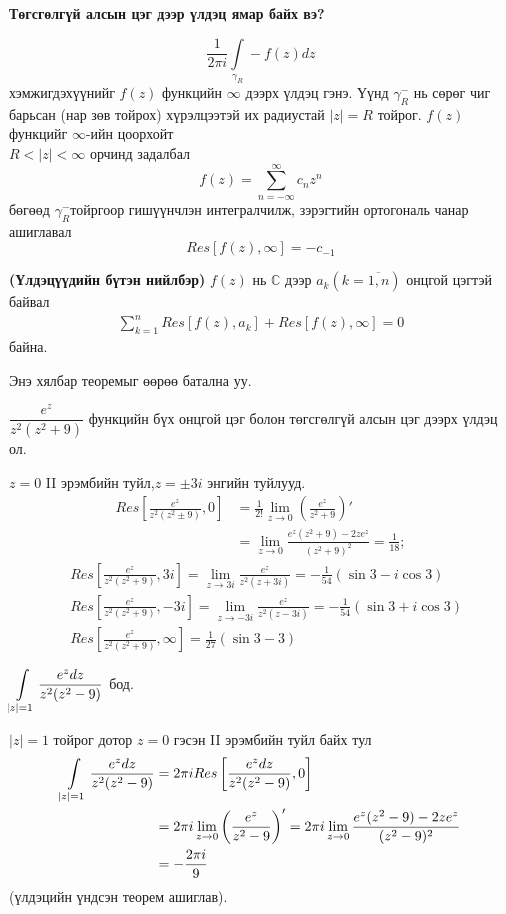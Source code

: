 \textbf{Төгсгөлгүй алсын цэг дээр үлдэц ямар байх вэ? } 
\begin{dfn}
$$\frac{1}{2\pi i}\int\limits_{\gamma_R}-f(z)dz$$
хэмжигдэхүүнийг $f(z)$ функцийн $\infty$ дээрх үлдэц гэнэ. Үүнд $\gamma^-_R$ нь сөрөг чиг барьсан (нар зөв тойрох) хүрэлцээтэй их радиустай $|z|=R$ тойрог. $f(z)$ функцийг $\infty$-ийн цоорхойт \\ $R<|z|<\infty$ орчинд задалбал
$$f(z)=\sum\limits_{n=-\infty}^\infty c_n z^n$$
бөгөөд $\gamma^-_R$тойргоор гишүүнчлэн интегралчилж, зэрэгтийн ортогональ чанар ашиглавал
$$Res [f(z),\infty]=-c_{-1}$$
\end{dfn}
\begin{thm}
\textbf{(Үлдэцүүдийн бүтэн нийлбэр)}  $f(z)$ нь $\mathbb{C}$ дээр $a_k(k=\overline{1,n})$ онцгой цэгтэй байвал
\begin{eqnarray}
\sum\limits_{k=1}^nRes [f(z),a_k]+Res [f(z),\infty]=0
\end{eqnarray} байна. 

Энэ хялбар теоремыг өөрөө батална уу.
\end{thm}
\begin{exm}
$\dfrac{e^z}{z^2(z^2+9)}$ функцийн бүх онцгой цэг болон төгсгөлгүй алсын цэг дээрх үлдэц ол.
\end{exm}
\begin{prf}
$z=0$ II эрэмбийн туйл,$z=\pm 3i$ энгийн туйлууд.
\begin{align*}
    Res \left[\frac{e^z}{z^2(z^2\pm 9)}, 0\right] &=\frac{1}{2!}\lim\limits_{z\rightarrow 0}\left(\frac{e^z}{z^2+9}\right)'\\
    &=\lim\limits_{z\rightarrow 0} \frac{e^z(z^2+9)-2ze^z}{(z^2+9)^2}=\frac{1}{18};
\end{align*}
\begin{align*}
    &Res \left[\frac{e^z}{z^2(z^2+ 9)}, 3i\right]=\lim\limits_{z\rightarrow 3i}\frac{e^z}{z^2(z+3i)}=-\frac{1}{54}(\sin 3-i\cos 3)\\
   &Res \left[\frac{e^z}{z^2(z^2+ 9)}, -3i\right]=\lim\limits_{z\rightarrow -3i}\frac{e^z}{z^2(z-3i)}=-\frac{1}{54}(\sin 3+i\cos 3)\\
   &Res \left[\frac{e^z}{z^2(z^2+ 9)}, \infty\right]=\frac{1}{27}(\sin 3-3)
\end{align*}
 \end{prf}
\begin{exm}
$\displaystyle\int\limits_{|z|=1} \dfrac{e^zdz}{z^2(z^2-9)}$ бод. 
\end{exm}
\begin{sol}
    $|z|=1$ тойрог дотор $z=0$ гэсэн II эрэмбийн туйл байх тул
    \begin{align*}
        \displaystyle\int\limits_{|z|=1} \dfrac{e^zdz}{z^2(z^2-9)}&=2 \pi i Res\left[ \dfrac{e^zdz}{z^2(z^2-9)}, 0\right]\\
        &=2 \pi i \lim\limits_{z\rightarrow 0}\left(\frac{e^z}{z^2-9}\right)'=2\pi i \lim\limits_{z\rightarrow 0}
        \frac{e^z(z^2-9)-2ze^z}{(z^2-9)^2} \\
        &=-\frac{2\pi i}{9}
    \end{align*}
    (үлдэцийн үндсэн теорем ашиглав). 
\end{sol}
